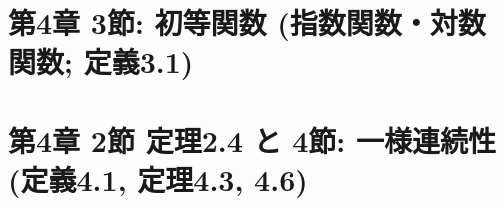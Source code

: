 \section{第4章 3節: 初等関数 (指数関数・対数関数; 定義3.1)}




\section{第4章 2節 定理2.4 と 4節: 一様連続性 (定義4.1, 定理4.3, 4.6)}






